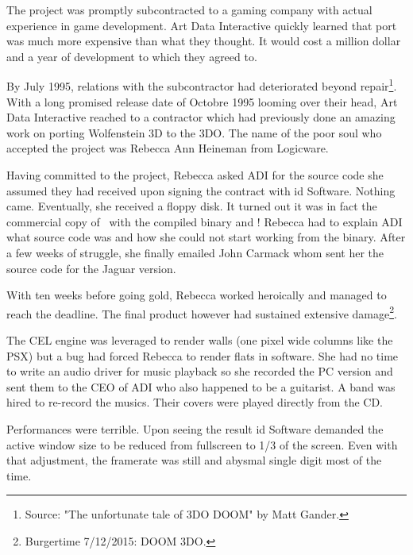 The project was promptly subcontracted to a gaming company with actual experience in game development. Art Data Interactive quickly learned that port was much more expensive than what they thought. It would cost a million dollar and a year of development to which they agreed to.\\
\par
By July 1995, relations with the subcontractor had deteriorated beyond repair\footnote{Source: "The unfortunate tale of 3DO DOOM" by Matt Gander.}. With a long promised release date of Octobre 1995 looming over their head, Art Data Interactive reached to a contractor which had previously done an amazing work on porting Wolfenstein 3D to the 3DO. The name of the poor soul who accepted the project was Rebecca Ann Heineman from Logicware.\\
\par
Having committed to the project, Rebecca asked ADI for the source code she assumed they had received upon signing the contract with id Software. Nothing came. Eventually, she received a floppy disk. It turned out it was in fact the commercial copy of \doom~with the compiled binary  and ! Rebecca had to explain ADI what source code was and how she could not start working from the binary. After a few weeks of struggle, she finally emailed John Carmack whom sent her the source code for the Jaguar version.\\
\par
 With ten weeks before going gold, Rebecca worked heroically and managed to reach the deadline. The final product however had sustained extensive damage\footnote{Burgertime 7/12/2015: DOOM 3DO.}.\\
\par
{}
\par
The CEL engine was leveraged to render walls (one pixel wide columns like the PSX) but a bug had forced Rebecca to render flats in software. She had no time to write an audio driver for music playback so she recorded the PC version and sent them to the CEO of ADI who also happened to be a guitarist. A band was hired to re-record the musics. Their covers were played directly from the CD.\\ 
\par
 Performances were terrible. Upon seeing the result id Software demanded the active window size to be reduced from fullscreen to 1/3 of the screen. Even with that adjustment, the framerate was still and abysmal single digit most of the time.\\
